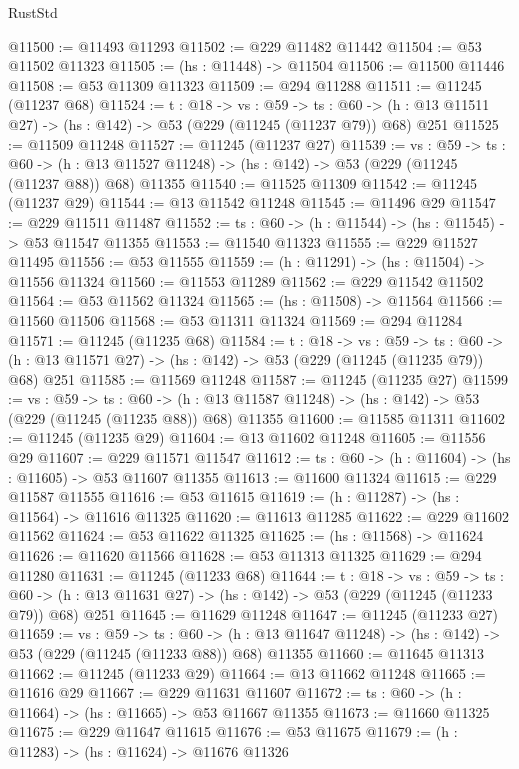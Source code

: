 \begin{lexlean}{RustStd}
\begin{coremodule}
@11500 := @11493 @11293
@11502 := @229 @11482 @11442
@11504 := @53 @11502 @11323
@11505 := (hs : @11448) -> @11504
@11506 := @11500 @11446
@11508 := @53 @11309 @11323
@11509 := @294 @11288
@11511 := @11245 (@11237 @68)
@11524 := {t : @18} ->
  {vs : @59} ->
  {ts : @60} -> (h : @13 @11511 @27) -> (hs : @142) -> @53 (@229 (@11245 (@11237 @79)) @68) @251
@11525 := @11509 @11248
@11527 := @11245 (@11237 @27)
@11539 := {vs : @59} ->
  {ts : @60} ->
  (h : @13 @11527 @11248) -> (hs : @142) -> @53 (@229 (@11245 (@11237 @88)) @68) @11355
@11540 := @11525 @11309
@11542 := @11245 (@11237 @29)
@11544 := @13 @11542 @11248
@11545 := @11496 @29
@11547 := @229 @11511 @11487
@11552 := {ts : @60} -> (h : @11544) -> (hs : @11545) -> @53 @11547 @11355
@11553 := @11540 @11323
@11555 := @229 @11527 @11495
@11556 := @53 @11555
@11559 := (h : @11291) -> (hs : @11504) -> @11556 @11324
@11560 := @11553 @11289
@11562 := @229 @11542 @11502
@11564 := @53 @11562 @11324
@11565 := (hs : @11508) -> @11564
@11566 := @11560 @11506
@11568 := @53 @11311 @11324
@11569 := @294 @11284
@11571 := @11245 (@11235 @68)
@11584 := {t : @18} ->
  {vs : @59} ->
  {ts : @60} -> (h : @13 @11571 @27) -> (hs : @142) -> @53 (@229 (@11245 (@11235 @79)) @68) @251
@11585 := @11569 @11248
@11587 := @11245 (@11235 @27)
@11599 := {vs : @59} ->
  {ts : @60} ->
  (h : @13 @11587 @11248) -> (hs : @142) -> @53 (@229 (@11245 (@11235 @88)) @68) @11355
@11600 := @11585 @11311
@11602 := @11245 (@11235 @29)
@11604 := @13 @11602 @11248
@11605 := @11556 @29
@11607 := @229 @11571 @11547
@11612 := {ts : @60} -> (h : @11604) -> (hs : @11605) -> @53 @11607 @11355
@11613 := @11600 @11324
@11615 := @229 @11587 @11555
@11616 := @53 @11615
@11619 := (h : @11287) -> (hs : @11564) -> @11616 @11325
@11620 := @11613 @11285
@11622 := @229 @11602 @11562
@11624 := @53 @11622 @11325
@11625 := (hs : @11568) -> @11624
@11626 := @11620 @11566
@11628 := @53 @11313 @11325
@11629 := @294 @11280
@11631 := @11245 (@11233 @68)
@11644 := {t : @18} ->
  {vs : @59} ->
  {ts : @60} -> (h : @13 @11631 @27) -> (hs : @142) -> @53 (@229 (@11245 (@11233 @79)) @68) @251
@11645 := @11629 @11248
@11647 := @11245 (@11233 @27)
@11659 := {vs : @59} ->
  {ts : @60} ->
  (h : @13 @11647 @11248) -> (hs : @142) -> @53 (@229 (@11245 (@11233 @88)) @68) @11355
@11660 := @11645 @11313
@11662 := @11245 (@11233 @29)
@11664 := @13 @11662 @11248
@11665 := @11616 @29
@11667 := @229 @11631 @11607
@11672 := {ts : @60} -> (h : @11664) -> (hs : @11665) -> @53 @11667 @11355
@11673 := @11660 @11325
@11675 := @229 @11647 @11615
@11676 := @53 @11675
@11679 := (h : @11283) -> (hs : @11624) -> @11676 @11326

\end{coremodule}
\end{lexlean}
